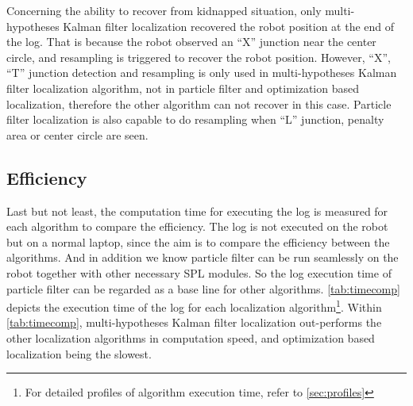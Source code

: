 Concerning the ability to recover from kidnapped situation, only multi-hypotheses Kalman filter localization recovered the robot position at the end of the log. That is because the robot observed an ``X'' junction near the center circle, and resampling is triggered to recover the robot position. However, ``X'', ``T'' junction detection and resampling is only used in multi-hypotheses Kalman filter localization algorithm, not in particle filter and optimization based localization, therefore the other algorithm can not recover in this case. Particle filter localization is also capable to do resampling when ``L'' junction, penalty area or center circle are seen.

\subsection{Efficiency}
\label{sub:Efficiency}
Last but not least, the computation time for executing the log is measured for each algorithm to compare the efficiency.  The log is not executed on the robot but on a normal laptop, since the aim is to compare the efficiency between the algorithms. And in addition we know particle filter can be run seamlessly on the robot together with other necessary \gls{SPL} modules. So the log execution time of particle filter can be regarded as a base line for other algorithms. \autoref{tab:timecomp} depicts the execution time of the log for each localization algorithm\footnote{For detailed profiles of algorithm execution time, refer to \autoref{sec:profiles}}. Within \autoref{tab:timecomp}, multi-hypotheses Kalman filter localization out-performs the other localization algorithms in computation speed, and optimization based localization being the slowest.




